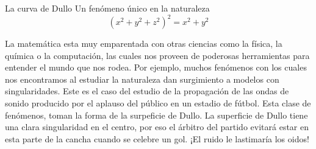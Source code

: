 \begin{surferPage}[Dullo]{La curva de Dullo}
Un fenómeno único en la naturaleza\\
\smallskip
\[(x^2+ y^2+ z^2)^2	= x^2+ y^2\]

\singlespacing
La matemática esta muy emparentada con otras ciencias como la física, la química o la computación, las cuales nos proveen de poderosas herramientas para entender el mundo que nos rodea. 
\singlespacing
Por ejemplo, muchos fenómenos con los cuales nos encontramos al estudiar la naturaleza dan surgimiento a modelos con singularidades.
\singlespacing
Este es el caso del estudio de la propagación de las ondas de sonido producido por el aplauso del público en un estadio de fútbol. Esta clase de fenómenos, toman la forma de la surpeficie de Dullo. La superficie de Dullo tiene una clara singularidad en el centro, por eso el árbitro del partido evitará estar en esta parte de la cancha cuando se celebre un gol. ¡El ruido le lastimaría los oidos!
\end{surferPage}
